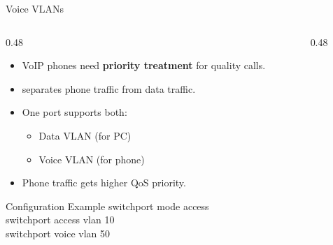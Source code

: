 \documentclass[aspectratio=169]{beamer}  %
\begin{document}
\begin{frame}{Voice VLANs}
    \begin{columns}[T]
        \begin{column}{0.48\textwidth}
            \begin{itemize}
                \item VoIP phones need \textbf{priority treatment} for quality calls.
                \item {} separates phone traffic from data traffic.
                \item One port supports both:
                    \begin{itemize}
                        \small
                        \item Data VLAN (for PC)
                        \item Voice VLAN (for phone)
                    \end{itemize}
                \item Phone traffic gets higher QoS priority.
            \end{itemize}
            
            \vspace{0.2em}
            \begin{block}{Configuration Example}
                \ttfamily\small
                switchport mode access \\
                switchport access vlan 10 \\
                switchport voice vlan 50
            \end{block}
        \end{column}
        \begin{column}{0.48\textwidth}
            \begin{center}
\end{center}
\end{column}
\end{columns}
\end{frame}
\end{document}
